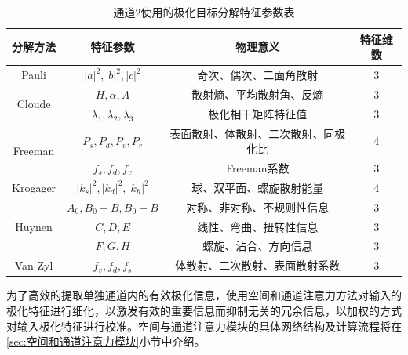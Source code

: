 \begin{table}[ht!]
    \caption{通道2使用的极化目标分解特征参数表}
    \label{tab:decomposition_features}
    \centering
    \begin{tabular}{cccc}
        \toprule[1.5bp]
        分解方法                     & 特征参数                                                             & 物理意义               & 特征维数 \\
        \midrule[0.75bp]
        Pauli                    & $\left| a \right|^2,\left| b \right|^2,\left| c \right|^2$
                                 & 奇次、偶次、二面角散射                                                      & 3                         \\
        \multirow{2}{*}{Cloude}  & $H,\alpha,A$                                                     & 散射熵、平均散射角、反熵       & 3    \\
                                 & $\lambda_1,\lambda_2,\lambda_3$                                  & 极化相干矩阵特征值          & 3    \\
        \multirow{2}{*}{Freeman} & $P_s,P_d,P_v,P_r$                                                & 表面散射、体散射、二次散射、同极化比 & 4    \\
                                 & $f_s,f_d,f_v$                                                    & Freeman系数          & 3    \\
        Krogager                 & $\left| k_s \right|^2,\left| k_d \right|^2,\left| k_h \right|^2$ & 球、双平面、螺旋散射能量       & 4    \\
        \multirow{3}{*}{Huynen}  & $A_0,B_0+B,B_0-B$                                                & 对称、非对称、不规则性信息      & 3    \\
                                 & $C,D,E$                                                          & 线性、弯曲、扭转性信息        & 3    \\
                                 & $F,G,H$                                                          & 螺旋、沾合、方向信息         & 3    \\
        Van Zyl                  & $f_v,f_d,f_s$                                                    & 体散射、二次散射、表面散射系数    & 3    \\
        \bottomrule[1.5bp]
    \end{tabular}
\end{table}

为了高效的提取单独通道内的有效极化信息，使用空间和通道注意力方法对输入的极化特征进行细化，以激发有效的重要信息而抑制无关的冗余信息，以加权的方式对输入极化特征进行校准。空间与通道注意力模块的具体网络结构及计算流程将在\ref{sec:空间和通道注意力模块}小节中介绍。

